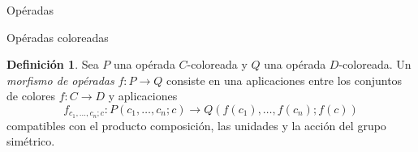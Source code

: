 \documentclass[12pt,aspectratio=169]{beamer}
\numberwithin{equation}{section}
\theoremstyle{definition}
\newtheorem{defi}[teo]{Definici\'on}
\begin{document}
{\begin{frame}{Op\'eradas}
\end{frame}

\begin{frame}{Op\'eradas coloreadas}
    \begin{defi}
        Sea $P$ una op\'erada $C$-coloreada y $Q$ una op\'erada $D$-coloreada. Un \emph{morfismo de op\'eradas} $f\colon P\to Q$ consiste en una aplicaciones entre los conjuntos de colores $f\colon C\to D$ y aplicaciones
        $$
            f_{c_1,\dots,c_n;c}: P(c_1,\dots,c_n;c) \longrightarrow Q(f(c_1),\dots,f(c_n);f(c))
        $$
        compatibles con el producto composici\'on, las unidades y la acci\'on del grupo sim\'etrico.
    \end{defi}

\end{frame}

}
\end{document}
